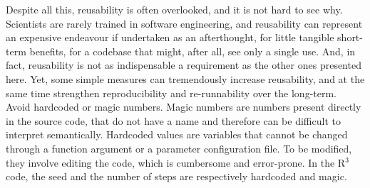 \documentclass[a4paper,11pt]{article}
\begin{document}
Despite all this, reusability is often overlooked, and it is not hard to see why. Scientists are rarely trained in software engineering, and reusability can represent an expensive endeavour if undertaken as an afterthought, for little tangible short-term benefits, for a codebase that might, after all, see only a single use. And, in fact, reusability is not as indispensable a requirement as the other ones presented here. Yet, some simple measures can tremendously increase reusability, and at the same time strengthen reproducibility and re-runnability over the long-term.\\

Avoid hardcoded or magic numbers. Magic numbers are numbers present directly in the source code, that do not have a name and therefore can be difficult to interpret semantically. Hardcoded values are variables that cannot be changed through a function argument or a parameter configuration file. To be modified, they involve editing the code, which is cumbersome and error-prone. In the R$^3$ code, the seed and the number of steps are respectively hardcoded and magic.\\

%
\end{document}
